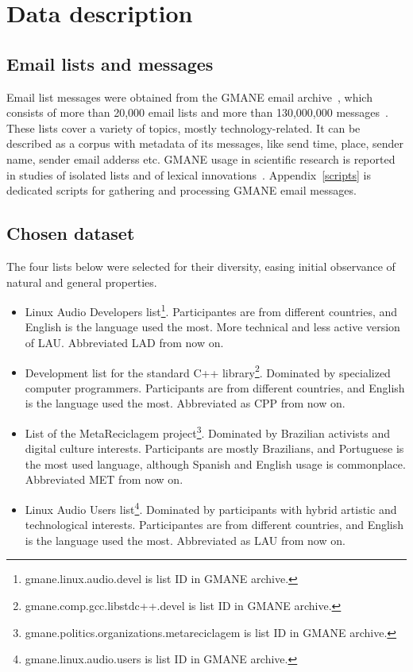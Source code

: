 \documentclass[%
 aip,
 jmp,%
 amsmath,amssymb,
 reprint,%
]{revtex4-1}
\begin{document}
\section{Data description}
    \subsection{Email lists and messages}
Email list messages were obtained from
the GMANE email archive~\cite{GMANE}, which consists of more than 20,000 email lists and more than 130,000,000 messages~\cite{GMANEwikipedia}. These lists cover a variety of topics, mostly technology-related. It can be described as a corpus with metadata of its messages, like send time, place, sender name, sender email adderss etc.
GMANE usage in scientific research is reported in studies of isolated lists and of lexical innovations~\cite{GMANE2,bird}. Appendix~\ref{scripts} is dedicated scripts for gathering and processing GMANE email messages.


    \subsection{Chosen dataset}
The four lists below were selected for their diversity, easing initial observance of natural and general properties.
\begin{itemize}
    \item Linux Audio Developers list\footnote{gmane.linux.audio.devel is list ID in GMANE archive.}. Participantes are from different countries, and English is the language used the most. More technical and less active version of LAU. Abbreviated LAD from now on.
    \item Development list for the standard C++ library\footnote{gmane.comp.gcc.libstdc++.devel is list ID in GMANE archive.}. Dominated by specialized computer programmers. Participants are from different countries, and English is the language used the most. Abbreviated as CPP from now on.
    \item List of the MetaReciclagem project\footnote{gmane.politics.organizations.metareciclagem is list ID in GMANE archive.}. Dominated by Brazilian activists and digital culture interests. Participants are mostly Brazilians, and Portuguese is the most used language, although Spanish and English usage is commonplace. Abbreviated MET from now on.
    \item Linux Audio Users list\footnote{gmane.linux.audio.users is list ID in GMANE archive.}. Dominated by participants with hybrid artistic and technological interests. Participantes are from different countries, and English is the language used the most. Abbreviated as LAU from now on.
\end{itemize} 
\end{document}
